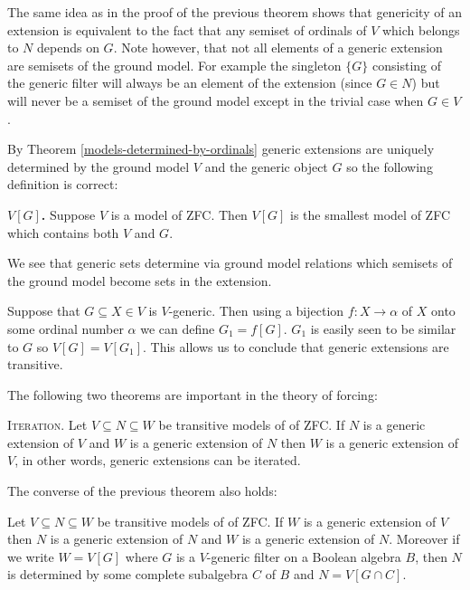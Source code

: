 The same idea as in the proof of the previous theorem shows that genericity of an extension is equivalent to the fact that any semiset of ordinals of $V$ which
belongs to $N$ depends on $G$. Note however, that not all elements of a generic extension are semisets of the ground model. For example the singleton $\{G\}$
consisting of the generic filter will always be an element of the extension (since $G\in N$) but will never be a semiset of the ground model except in the trivial case when
$G\in V$.

\smallskip

By Theorem \ref{models-determined-by-ordinals} generic extensions are uniquely determined by the ground model $V$ and the generic object $G$ so the following
definition is correct:

\begin{definition}{\bf {$V[G]$}.}
Suppose $V$ is a model of ZFC. Then $V[G]$ is the smallest model of ZFC which contains both $V$ and $G$.
\end{definition}

We see that generic sets determine via ground model relations which semisets of the ground model become sets in the extension.

Suppose that $G\subseteq X\in V$ is $V$-generic. Then using a bijection $f:X\to\alpha$ of $X$ onto some ordinal number $\alpha$ we can define $G_1=f[G]$. $G_1$
is easily seen to be similar to $G$ so $V[G]=V[G_1]$. This allows us to conclude that generic extensions are transitive.

The following two theorems are important in the theory of forcing:

\begin{theorem}\label{iteration}{\scshape Iteration.}
Let $V\subseteq N\subseteq W$ be transitive models of of ZFC. If $N$ is a generic extension of $V$ and $W$ is a generic
extension of $N$ then $W$ is a generic extension of $V$, in other words, generic extensions can be iterated.
\end{theorem}

The converse of the previous theorem also holds:

\begin{theorem}
Let $V\subseteq N\subseteq W$ be transitive models of of ZFC. If $W$ is a generic extension of $V$ then $N$ is a generic extension of $N$ and $W$ is a generic extension of $N$. Moreover if we write $W=V[G]$ where $G$ is a $V$-generic filter on a Boolean algebra $B$, then $N$ is determined by some complete subalgebra $C$ of $B$ and $N=V[G\cap C]$.
\end{theorem}

